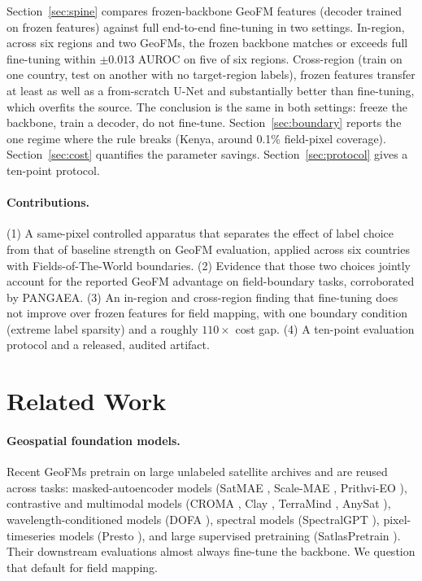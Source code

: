 \documentclass{article}
\begin{document}
Section~\ref{sec:spine} compares frozen-backbone GeoFM features (decoder trained on
frozen features) against full end-to-end fine-tuning in two settings. In-region,
across six regions and two GeoFMs, the frozen backbone matches or exceeds full
fine-tuning within $\pm 0.013$ AUROC on five of six regions. Cross-region (train on
one country, test on another with no target-region labels), frozen features transfer
at least as well as a from-scratch U-Net and substantially better than fine-tuning,
which overfits the source. The conclusion is the same in both settings: freeze the
backbone, train a decoder, do not fine-tune. Section~\ref{sec:boundary} reports the
one regime where the rule breaks (Kenya, around 0.1\% field-pixel coverage).
Section~\ref{sec:cost} quantifies the parameter savings. Section~\ref{sec:protocol}
gives a ten-point protocol.

\paragraph{Contributions.} (1) A same-pixel controlled apparatus that separates the
effect of label choice from that of baseline strength on GeoFM evaluation, applied
across six countries with Fields-of-The-World boundaries. (2) Evidence that those
two choices jointly account for the reported GeoFM advantage on field-boundary tasks,
corroborated by PANGAEA. (3) An in-region and cross-region finding that fine-tuning
does not improve over frozen features for field mapping, with one boundary condition
(extreme label sparsity) and a roughly $110\times$ cost gap. (4) A ten-point
evaluation protocol and a released, audited artifact.

\section{Related Work}
\label{sec:related}
\paragraph{Geospatial foundation models.} Recent GeoFMs pretrain on large unlabeled
satellite archives and are reused across tasks: masked-autoencoder models (SatMAE
\citep{satmae}, Scale-MAE \citep{scalemae}, Prithvi-EO \citep{prithvi}), contrastive
and multimodal models (CROMA \citep{croma}, Clay \citep{clay}, TerraMind
\citep{terramind}, AnySat \citep{anysat}), wavelength-conditioned models (DOFA
\citep{dofa}), spectral models (SpectralGPT \citep{spectralgpt}), pixel-timeseries
models (Presto \citep{presto}), and large supervised pretraining (SatlasPretrain
\citep{satlas}). Their downstream evaluations almost always fine-tune the backbone.
We question that default for field mapping.
\end{document}
